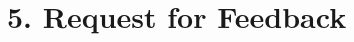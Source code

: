 \documentclass[11pt, a4paper, twoside, openright]{report}
\begin{document}
\section*{5. Request for Feedback}

\backmatter

%


\end{document}
